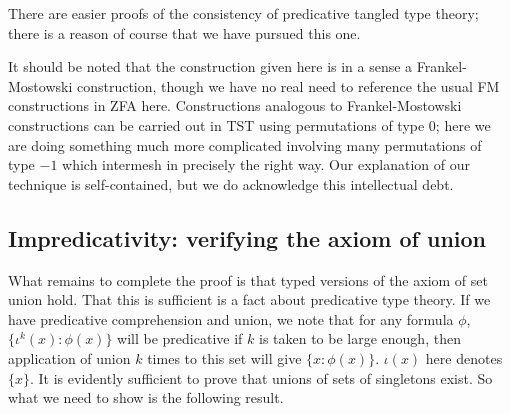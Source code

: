 \documentclass{article}
\theoremstyle{definition}
\theoremstyle{remark}
\begin{document}
There are easier proofs of the consistency of predicative tangled type theory; 
there is a reason of course that we have pursued this one.

It should be noted that the construction given here is in a sense a Frankel-Mostowski construction, though we have no real need to reference the usual
FM constructions in ZFA here.  Constructions analogous to Frankel-Mostowski constructions can be carried out in TST using permutations of type 0;  here we are doing something much more complicated involving many permutations of type $-1$ which intermesh in precisely the right way.  Our explanation of our technique is self-contained, but we do acknowledge this intellectual debt.



\newpage
\subsection{Impredicativity:  verifying the axiom of union}\label{ss:impredicativity}

What remains to complete the proof is that typed versions of the axiom of set union hold.  That this is sufficient is a fact about predicative type theory.
If we have predicative comprehension and union, we note that for any formula $\phi$, $\{\iota^k(x):\phi(x)\}$ will be predicative if $k$ is taken to be large enough, then application of union $k$ times to this set will give $\{x:\phi(x)\}$.  $\iota(x)$ here denotes $\{x\}$.  It is evidently sufficient to prove that unions of sets of singletons exist.
{So what we need to show is the following result.}
\end{document}
